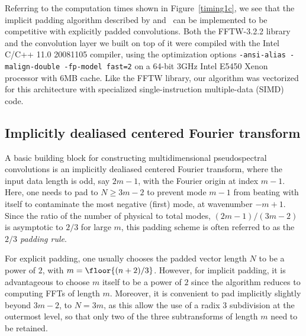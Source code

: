\documentclass[final]{siamltex}
\begin{document}
Referring to the computation times shown in Figure~\ref{timing1c},
we see that the implicit padding algorithm described by  
and~
can be implemented to be competitive with explicitly padded
convolutions. Both the FFTW-3.2.2 library and the convolution layer we built on
top of it were compiled with the Intel C/C++ 11.0 20081105 compiler, using
the optimization options {\tt -ansi-alias -malign-double -fp-model fast=2}
on a 64-bit 3GHz Intel E5450 Xenon processor with 6MB cache. Like the FFTW
library, our algorithm was vectorized for this architecture with
specialized single-instruction multiple-data (SIMD) code.

\subsection{Implicitly dealiased centered Fourier transform}\label{fft0}
A basic building block for constructing multidimensional pseudospectral
convolutions is an implicitly dealiased centered Fourier transform, where the
input data length is odd, say $2m-1$, with the Fourier origin at index $m-1$. 
Here, one needs to pad to $N\ge 3m-2$ to prevent 
mode $m-1$ from beating with itself to contaminate the most negative
(first) mode, at wavenumber $-m+1$. Since the ratio of the number of physical to
total modes, $(2m-1)/(3m-2)$ is asymptotic to $2/3$ for large $m$, this
padding scheme is often referred to as the {\it $2/3$ padding rule}.

For explicit padding, one usually chooses the padded vector length
$N$ to be a power of $2$, with $m=\floor{(n+2)/3}$.
However, for implicit
padding, it is advantageous to choose $m$ itself to be a power of $2$
since the algorithm reduces to computing FFTs of length $m$.
Moreover, it is convenient to pad implicitly slightly beyond $3m-2$, to $N=3m$,
as this allow the use of a radix $3$ subdivision at the outermost level, so
that only two of the three subtransforms of length $m$ need to be retained. 
\end{document}
